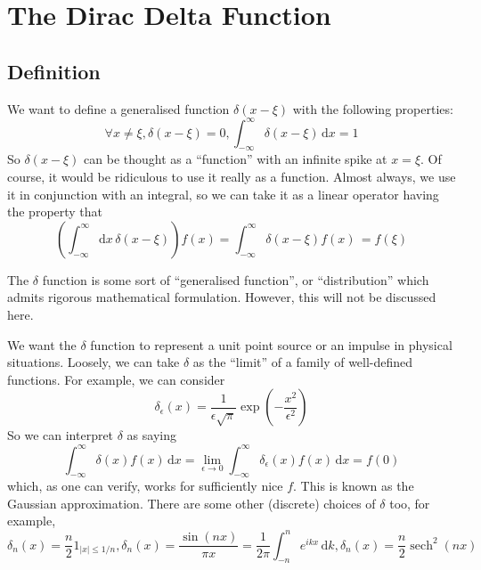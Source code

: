 \section{The Dirac Delta Function}
\subsection{Definition}
We want to define a generalised function $\delta(x-\xi)$ with the following properties:
$$\forall x\neq\xi,\delta(x-\xi)=0,\int_{-\infty}^\infty\delta(x-\xi)\,\mathrm dx=1$$
So $\delta(x-\xi)$ can be thought as a ``function'' with an infinite spike at $x=\xi$.
Of course, it would be ridiculous to use it really as a function.
Almost always, we use it in conjunction with an integral, so we can take it as a linear operator having the property that
$$\left( \int_{-\infty}^\infty\mathrm dx\,\delta(x-\xi) \right)f(x)=\int_{-\infty}^\infty\delta(x-\xi)f(x)\,\mathrm=f(\xi)$$
\begin{note}
    The $\delta$ function is some sort of ``generalised function'', or ``distribution'' which admits rigorous mathematical formulation.
    However, this will not be discussed here.
\end{note}
We want the $\delta$ function to represent a unit point source or an impulse in physical situations.
Loosely, we can take $\delta$ as the ``limit'' of a family of well-defined functions.
For example, we can consider
$$\delta_\epsilon(x)=\frac{1}{\epsilon\sqrt{\pi}}\exp\left( -\frac{x^2}{\epsilon^2} \right)$$
So we can interpret $\delta$ as saying
$$\int_{-\infty}^\infty\delta(x)f(x)\,\mathrm dx=\lim_{\epsilon\to 0}\int_{-\infty}^\infty\delta_\epsilon(x)f(x)\,\mathrm dx=f(0)$$
which, as one can verify, works for sufficiently nice $f$.
This is known as the Gaussian approximation.
There are some other (discrete) choices of $\delta$ too, for example,
$$\delta_n(x)=\frac{n}{2}1_{|x|\le 1/n},\delta_n(x)=\frac{\sin(nx)}{\pi x}=\frac{1}{2\pi}\int_{-n}^ne^{ikx}\,\mathrm dk,\delta_n(x)=\frac{n}{2}\operatorname{sech}^2(nx)$$
